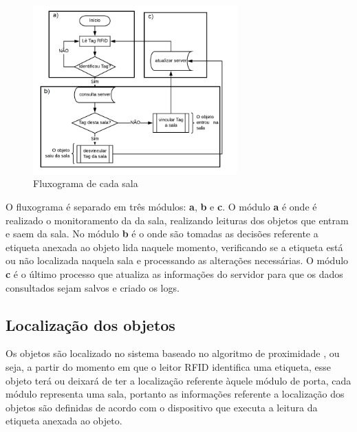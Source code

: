 \begin{figure}[H]
              \caption{\label{fig:fluxograma}{Fluxograma de cada sala}}
              \centering
              \includegraphics[width=0.7\textwidth]{Figuras/fluxograma.png}
\end{figure}

\par
O fluxograma é separado em três módulos: \textbf{a}, \textbf{b} e \textbf{c}. O módulo \textbf{a} é onde é realizado o
monitoramento da da sala, realizando leituras dos objetos que entram e saem da sala. No módulo \textbf{b} é o onde são
tomadas as decisões referente a etiqueta anexada ao objeto lida naquele momento, verificando se a etiqueta está ou não
localizada naquela sala e processando as alterações necessárias. O módulo \textbf{c} é o último processo que atualiza as
informações do servidor para que os dados consultados sejam salvos e criado os logs.


\subsection{Localização dos objetos}

Os objetos são localizado no sistema baseado no algoritmo de proximidade\cite{rfid2009review} , ou seja, a partir do momento em que o leitor
RFID identifica uma etiqueta, esse objeto terá ou deixará de ter a localização referente àquele módulo de porta, cada módulo representa uma sala, portanto as informações referente a localização dos objetos são definidas de acordo com o dispositivo que executa a leitura da etiqueta anexada ao objeto.

